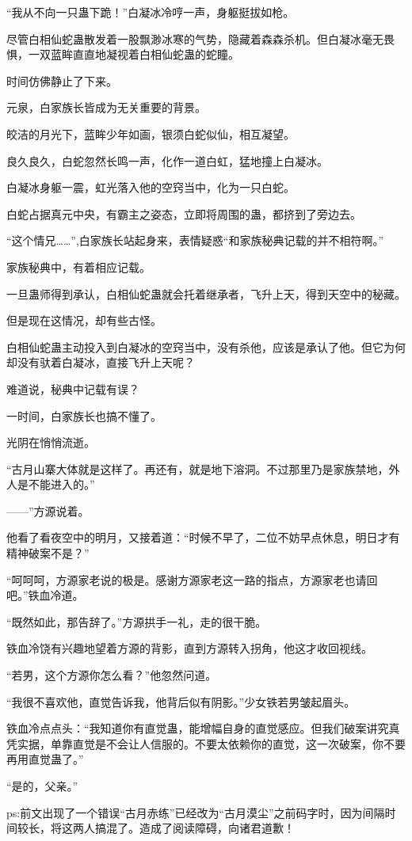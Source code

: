 \begin{this_body}
“我从不向一只蛊下跪！”白凝冰冷哼一声，身躯挺拔如枪。

尽管白相仙蛇蛊散发着一股飘渺冰寒的气势，隐藏着森森杀机。但白凝冰毫无畏惧，一双蓝眸直直地凝视着白相仙蛇蛊的蛇瞳。

时间仿佛静止了下来。

元泉，白家族长皆成为无关重要的背景。

皎洁的月光下，蓝眸少年如画，银须白蛇似仙，相互凝望。

良久良久，白蛇忽然长鸣一声，化作一道白虹，猛地撞上白凝冰。

白凝冰身躯一震，虹光落入他的空窍当中，化为一只白蛇。

白蛇占据真元中央，有霸主之姿态，立即将周围的蛊，都挤到了旁边去。

“这个情兄……”,白家族长站起身来，表情疑惑“和家族秘典记载的并不相符啊。”

家族秘典中，有着相应记载。

一旦蛊师得到承认，白相仙蛇蛊就会托着继承者，飞升上天，得到天空中的秘藏。

但是现在这情况，却有些古怪。

白相仙蛇蛊主动投入到白凝冰的空窍当中，没有杀他，应该是承认了他。但它为何却没有驮着白凝冰，直接飞升上天呢？

难道说，秘典中记载有误？

一时间，白家族长也搞不懂了。

光阴在悄悄流逝。

“古月山寨大体就是这样了。再还有，就是地下溶洞。不过那里乃是家族禁地，外人是不能进入的。”

——”方源说着。

他看了看夜空中的明月，又接着道：“时候不早了，二位不妨早点休息，明日才有精神破案不是？”

“呵呵呵，方源家老说的极是。感谢方源家老这一路的指点，方源家老也请回吧。”铁血冷道。

“既然如此，那告辞了。”方源拱手一礼，走的很干脆。

铁血冷饶有兴趣地望着方源的背影，直到方源转入拐角，他这才收回视线。

“若男，这个方源你怎么看？”他忽然问道。

“我很不喜欢他，直觉告诉我，他背后似有阴影。”少女铁若男皱起眉头。

铁血冷点点头：“我知道你有直觉蛊，能增幅自身的直觉感应。但我们破案讲究真凭实据，单靠直觉是不会让人信服的。不要太依赖你的直觉，这一次破案，你不要再用直觉蛊了。”

“是的，父亲。”

ps:前文出现了一个错误“古月赤练”已经改为“古月漠尘”之前码字时，因为间隔时间较长，将这两人搞混了。造成了阅读障碍，向诸君道歉！

\end{this_body}

